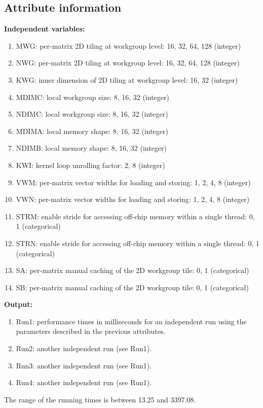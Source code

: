 \documentclass[sigconf,authorversion]{acmart}
\begin{document}
\subsection{Attribute information}
\textbf{Independent variables:}
\begin{enumerate}
  \item  MWG: per-matrix 2D tiling at workgroup level: {16, 32, 64, 128} (integer)
  \item NWG: per-matrix 2D tiling at workgroup level: {16, 32, 64, 128} (integer)
  \item KWG: inner dimension of 2D tiling at workgroup level: {16, 32} (integer)
  \item MDIMC: local workgroup size: {8, 16, 32} (integer)
  \item NDIMC: local workgroup size: {8, 16, 32} (integer)
  \item MDIMA: local memory shape: {8, 16, 32} (integer)
  \item NDIMB: local memory shape: {8, 16, 32} (integer)
  \item KWI: kernel loop unrolling factor: {2, 8} (integer)
  \item VWM: per-matrix vector widths for loading and storing: {1, 2, 4, 8} (integer)
  \item VWN: per-matrix vector widths for loading and storing: {1, 2, 4, 8} (integer)
  \item STRM: enable stride for accessing off-chip memory within a single thread: {0, 1} (categorical)
  \item STRN: enable stride for accessing off-chip memory within a single thread: {0, 1} (categorical)
  \item SA: per-matrix manual caching of the 2D workgroup tile: {0, 1} (categorical)
  \item SB: per-matrix manual caching of the 2D workgroup tile: {0, 1} (categorical)
\end{enumerate}

\textbf{Output:}
\begin{enumerate}[resume]
  \item Run1: performance times in milliseconds for an independent run using the parameters described in the previous attributes.
  \item Run2: another independent run (see Run1).
  \item Run3: another independent run (see Run1).
  \item Run4: another independent run (see Run1).
\end{enumerate}
The range of the running times is between 13.25 and 3397.08.
\end{document}

